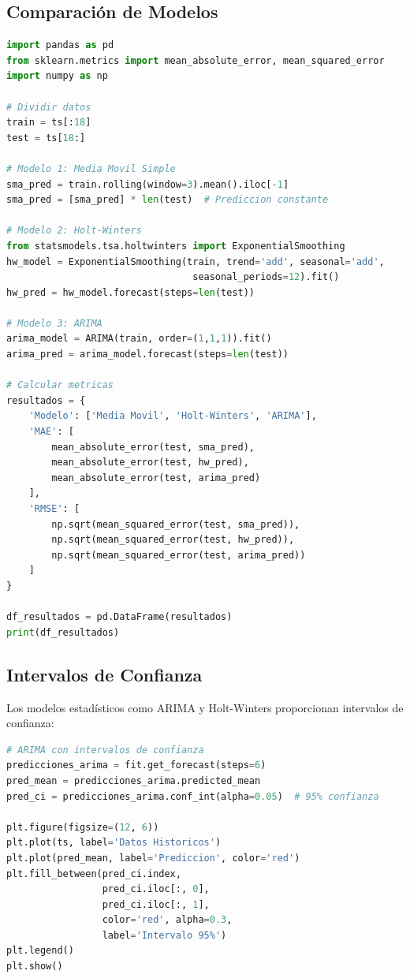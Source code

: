 \documentclass[12pt]{article}
\begin{document}
\subsection{Comparación de Modelos}

\begin{lstlisting}[language=Python]
import pandas as pd
from sklearn.metrics import mean_absolute_error, mean_squared_error
import numpy as np

# Dividir datos
train = ts[:18]
test = ts[18:]

# Modelo 1: Media Movil Simple
sma_pred = train.rolling(window=3).mean().iloc[-1]
sma_pred = [sma_pred] * len(test)  # Prediccion constante

# Modelo 2: Holt-Winters
from statsmodels.tsa.holtwinters import ExponentialSmoothing
hw_model = ExponentialSmoothing(train, trend='add', seasonal='add',
                                 seasonal_periods=12).fit()
hw_pred = hw_model.forecast(steps=len(test))

# Modelo 3: ARIMA
arima_model = ARIMA(train, order=(1,1,1)).fit()
arima_pred = arima_model.forecast(steps=len(test))

# Calcular metricas
resultados = {
    'Modelo': ['Media Movil', 'Holt-Winters', 'ARIMA'],
    'MAE': [
        mean_absolute_error(test, sma_pred),
        mean_absolute_error(test, hw_pred),
        mean_absolute_error(test, arima_pred)
    ],
    'RMSE': [
        np.sqrt(mean_squared_error(test, sma_pred)),
        np.sqrt(mean_squared_error(test, hw_pred)),
        np.sqrt(mean_squared_error(test, arima_pred))
    ]
}

df_resultados = pd.DataFrame(resultados)
print(df_resultados)
\end{lstlisting}

\subsection{Intervalos de Confianza}

Los modelos estadísticos como ARIMA y Holt-Winters proporcionan intervalos de confianza:

\begin{lstlisting}[language=Python]
# ARIMA con intervalos de confianza
predicciones_arima = fit.get_forecast(steps=6)
pred_mean = predicciones_arima.predicted_mean
pred_ci = predicciones_arima.conf_int(alpha=0.05)  # 95% confianza

plt.figure(figsize=(12, 6))
plt.plot(ts, label='Datos Historicos')
plt.plot(pred_mean, label='Prediccion', color='red')
plt.fill_between(pred_ci.index,
                 pred_ci.iloc[:, 0],
                 pred_ci.iloc[:, 1],
                 color='red', alpha=0.3,
                 label='Intervalo 95%')
plt.legend()
plt.show()
\end{lstlisting}
\end{document}

